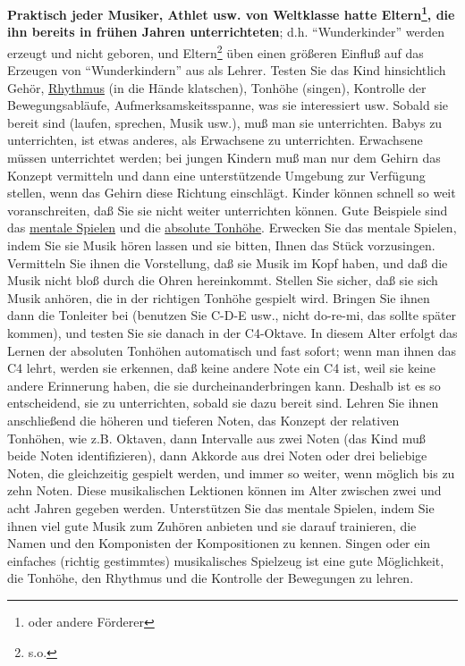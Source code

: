 \textbf{Praktisch jeder Musiker, Athlet usw. von Weltklasse hatte Eltern\footnote{oder andere Förderer}, die ihn bereits in frühen Jahren unterrichteten}; d.h. \enquote{Wunderkinder} werden erzeugt und nicht geboren, und Eltern\footnote{s.o.} üben einen größeren Einfluß auf das Erzeugen von \enquote{Wunderkindern} aus als Lehrer.
Testen Sie das Kind hinsichtlich Gehör, \hyperlink{c1iii1b}{Rhythmus} (in die Hände klatschen), Tonhöhe (singen), Kontrolle der Bewegungsabläufe, Aufmerksamskeitsspanne, was sie interessiert usw.
Sobald sie bereit sind (laufen, sprechen, Musik usw.), muß man sie unterrichten.
Babys zu unterrichten, ist etwas anderes, als Erwachsene zu unterrichten.
Erwachsene müssen unterrichtet werden; bei jungen Kindern muß man nur dem Gehirn das Konzept vermitteln und dann eine unterstützende Umgebung zur Verfügung stellen, wenn das Gehirn diese Richtung einschlägt.
Kinder können schnell so weit voranschreiten, daß Sie sie nicht weiter unterrichten können.
Gute Beispiele sind das \hyperlink{c1ii12mental}{mentale Spielen} und die \hyperlink{c1iii12}{absolute Tonhöhe}.
Erwecken Sie das mentale Spielen, indem Sie sie Musik hören lassen und sie bitten, Ihnen das Stück vorzusingen.
Vermitteln Sie ihnen die Vorstellung, daß sie Musik im Kopf haben, und daß die Musik nicht bloß durch die Ohren hereinkommt.
Stellen Sie sicher, daß sie sich Musik anhören, die in der richtigen Tonhöhe gespielt wird.
Bringen Sie ihnen dann die Tonleiter bei (benutzen Sie C-D-E usw., nicht do-re-mi, das sollte später kommen), und testen Sie sie danach in der C4-Oktave.
In diesem Alter erfolgt das Lernen der absoluten Tonhöhen automatisch und fast sofort; wenn man ihnen das C4 lehrt, werden sie erkennen, daß keine andere Note ein C4 ist, weil sie keine andere Erinnerung haben, die sie durcheinanderbringen kann.
Deshalb ist es so entscheidend, sie zu unterrichten, sobald sie dazu bereit sind.
Lehren Sie ihnen anschließend die höheren und tieferen Noten, das Konzept der relativen Tonhöhen, wie z.B. Oktaven, dann Intervalle aus zwei Noten (das Kind muß beide Noten identifizieren), dann Akkorde aus drei Noten oder drei beliebige Noten, die gleichzeitig gespielt werden, und immer so weiter, wenn möglich bis zu zehn Noten.
Diese musikalischen Lektionen können im Alter zwischen zwei und acht Jahren gegeben werden.
Unterstützen Sie das mentale Spielen, indem Sie ihnen viel gute Musik zum Zuhören anbieten und sie darauf trainieren, die Namen und den Komponisten der Kompositionen zu kennen.
Singen oder ein einfaches (richtig gestimmtes) musikalisches Spielzeug ist eine gute Möglichkeit, die Tonhöhe, den Rhythmus und die Kontrolle der Bewegungen zu lehren.
